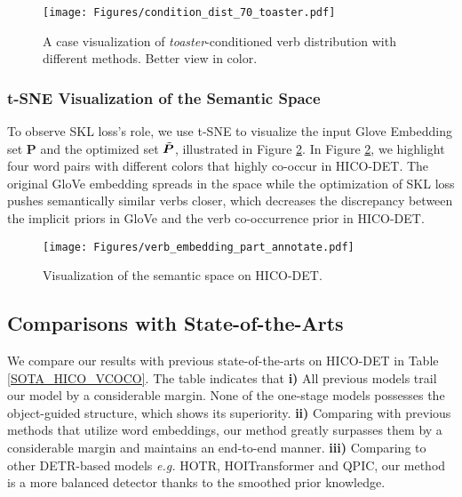 \documentclass[letterpaper]{article} %
\begin{document}
\begin{figure}[t]
\centering
\texttt{[image: Figures/condition\_dist\_70\_toaster.pdf]} 
\caption{A case visualization of \textit{toaster}-conditioned verb distribution with different methods. Better view in color.}
\label{verb_distribution}
\end{figure}


\subsubsection{t-SNE Visualization of the Semantic Space} To observe SKL loss's role, we use t-SNE \cite{maaten2008visualizingt-SNE} to visualize the input Glove Embedding set $\bm{P}$ and the optimized set $\Tilde{\bm{P}}$, illustrated in Figure \ref{verb_embedding}. In Figure \ref{verb_embedding}, we highlight four word pairs with different colors that highly co-occur in HICO-DET. The original GloVe embedding spreads in the space while the optimization of SKL loss pushes semantically similar verbs closer, which decreases the discrepancy between the implicit priors in GloVe and the verb co-occurrence prior in HICO-DET.


\begin{figure}[t]
\centering
\texttt{[image: Figures/verb\_embedding\_part\_annotate.pdf]} 
\caption{Visualization of the semantic space on HICO-DET.}
\label{verb_embedding}
\end{figure}






\subsection{Comparisons with State-of-the-Arts} We compare our results with previous state-of-the-arts on HICO-DET in Table \ref{SOTA_HICO_VCOCO}. The table indicates that \textbf{i)} All previous models trail our model by a considerable margin. None of the one-stage models possesses the object-guided structure, which shows its superiority. \textbf{ii)} Comparing with previous methods that utilize word embeddings, our method greatly surpasses them by a considerable margin and maintains an end-to-end manner. \textbf{iii)} Comparing to other DETR-based models \textit{e.g.} HOTR, HOITransformer and QPIC, our method is a more balanced detector thanks to the smoothed prior knowledge.
\end{document}
